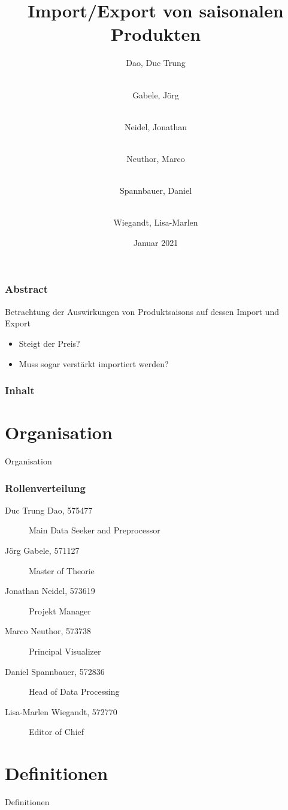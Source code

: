 \documentclass{beamer}
\title{Import/Export von saisonalen Produkten}
\author[Dao, Gabele, Neidel, Neuthor, Spannbauer, Wiegandt]{
  Dao, Duc Trung \and\\
  Gabele, Jörg \and\\
  Neidel, Jonathan \and\\
  Neuthor, Marco \and\\
  Spannbauer, Daniel \and\\
  Wiegandt, Lisa-Marlen
}
\date{Januar 2021}
\institute{HTW Berlin, Angewandte Informatik}
\begin{document}
\frame{\titlepage}

\begin{frame}
	\frametitle{Abstract}
	Betrachtung der Auswirkungen von Produktsaisons auf dessen Import und Export
	\begin{itemize}
		\item Steigt der Preis?
		\item Muss sogar verstärkt importiert werden?
	\end{itemize}
\end{frame}

\begin{frame}
\frametitle{Inhalt}
\tableofcontents
\end{frame}

\section{Organisation}

\begin{frame}
	\begin{center}
	{\Huge Organisation}
	\end{center}
\end{frame}

\begin{frame}
	\frametitle{Rollenverteilung}
	\begin{description}
		\item[Duc Trung Dao, 575477]Main Data Seeker and Preprocessor
		\item[Jörg Gabele, 571127]Master of Theorie
		\item[Jonathan Neidel, 573619]Projekt Manager
		\item[Marco Neuthor, 573738]Principal Visualizer
		\item[Daniel Spannbauer, 572836]Head of Data Processing
		\item[Lisa-Marlen Wiegandt, 572770]Editor of Chief
	\end{description}
    \end{frame}

\section{Definitionen} %
\begin{frame}
	\begin{center}
		{\Huge Definitionen}
	\end{center}
\end{frame}
\end{document}

